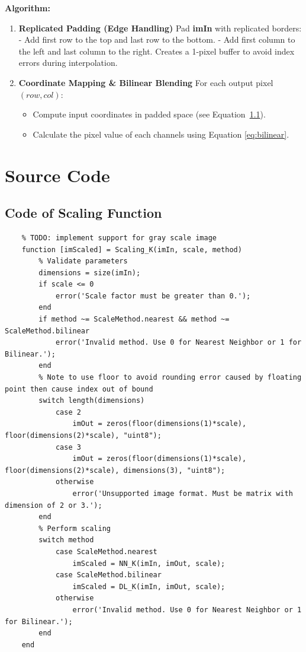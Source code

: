 \documentclass[a4paper,11pt]{article}
\begin{document}
\textbf{Algorithm:}
\begin{enumerate}
\item \textbf{Replicated Padding (Edge Handling)}
    Pad \textbf{imIn} with replicated borders:\\
              - Add first row to the top and last row to the bottom.
              - Add first column to the left and last column to the right.
              Creates a 1-pixel buffer to avoid index errors during interpolation.
\item \textbf{Coordinate Mapping \& Bilinear Blending}
    For each output pixel \((row, col)\):
            \begin{itemize}
                \item Compute input coordinates in padded space (see Equation~\ref{}).
                \item Calculate the pixel value of each channels using Equation \ref{eq:bilinear}.
            \end{itemize}
\end{enumerate}


\section{Source Code}
\subsection{Code of Scaling Function}
\lstset{language = Matlab}
\begin{lstlisting}[basicstyle=\tiny]
    %This function provides a image scaling algorithm.
    % TODO: implement support for gray scale image
    function [imScaled] = Scaling_K(imIn, scale, method)
        % Validate parameters
        dimensions = size(imIn);
        if scale <= 0
            error('Scale factor must be greater than 0.');
        end
        if method ~= ScaleMethod.nearest && method ~= ScaleMethod.bilinear
            error('Invalid method. Use 0 for Nearest Neighbor or 1 for Bilinear.');
        end
        % Note to use floor to avoid rounding error caused by floating point then cause index out of bound
        switch length(dimensions)
            case 2 
                imOut = zeros(floor(dimensions(1)*scale), floor(dimensions(2)*scale), "uint8");
            case 3
                imOut = zeros(floor(dimensions(1)*scale), floor(dimensions(2)*scale), dimensions(3), "uint8");
            otherwise
                error('Unsupported image format. Must be matrix with dimension of 2 or 3.');
        end
        % Perform scaling
        switch method
            case ScaleMethod.nearest
                imScaled = NN_K(imIn, imOut, scale);
            case ScaleMethod.bilinear
                imScaled = DL_K(imIn, imOut, scale);
            otherwise
                error('Invalid method. Use 0 for Nearest Neighbor or 1 for Bilinear.');
        end
    end
\end{lstlisting}
\end{document}
